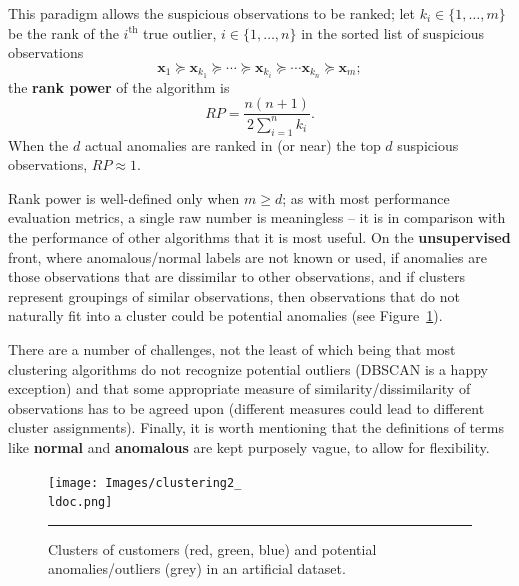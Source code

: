 \par This paradigm allows the suspicious observations to be ranked; let $k_i\in\{1,\ldots,m\}$ be the rank of the $i^{\text{th}}$ true outlier, $i\in \{1,\ldots,n\}$ in the sorted list of suspicious observations $$\mathbf{x}_1\succeq \mathbf{x}_{k_1}\succeq \cdots\succeq\mathbf{x}_{k_i}\succeq \cdots \mathbf{x}_{k_n}\succeq \mathbf{x}_m;$$ the \textbf{rank power} of the algorithm is $$RP=\frac{n(n+1)}{2\sum_{i=1}^nk_i}.$$ When the $d$ actual anomalies are ranked in (or near) the top $d$ suspicious observations, $RP\approx 1$. \par Rank power is well-defined only when $m\geq d$; as with most performance evaluation metrics, a single raw number is meaningless -- it is in comparison with the performance of other algorithms that it is most useful.  \newl On the \textbf{unsupervised} front, where anomalous/normal labels are not known or used, if anomalies are those observations that are dissimilar to other observations, and if clusters represent groupings of similar observations, then observations that do not naturally fit into a cluster could be potential anomalies (see Figure~\ref{fig:clust2}). \par There are a number of challenges, not the least of which being that most clustering algorithms do not recognize potential outliers (DBSCAN is a happy exception) and that some appropriate measure of similarity/dissimilarity of observations has to be agreed upon (different measures could lead to different cluster assignments). \newl Finally, it is worth mentioning that the definitions of terms like \textbf{normal} and \textbf{anomalous} are kept purposely vague, to allow for flexibility. 
\begin{figure}[t]
\centering
\texttt{[image: Images/clustering2\_\\ldoc.png]}
\caption{\small Clusters of customers (red, green, blue) and potential anomalies/outliers (grey) in an artificial dataset.}\hrule\label{fig:clust2}
\end{figure}

